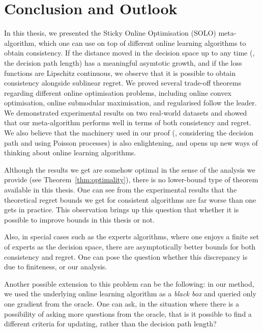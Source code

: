 \chapter{Conclusion and Outlook}

In this thesis, we presented the Sticky Online Optimisation (SOLO) meta-algorithm, which one can use on top of different online learning algorithms to obtain consistency. If the distance moved in the decision space up to any time (\ie, the decision path length) has a meaningful asymtotic growth, and if the loss functions are Lipschitz continuous, we observe that it is possible to obtain consistency alongside sublinear regret. We proved several trade-off theorems regarding different online optimisation problems, including online convex optimisation, online submodular maximisation, and regularised follow the leader. We demonstrated experimental results on two real-world datasets and showed that our meta-algorithm performs well in terms of both consistency and regret. We also believe that the machinery used in our proof (\eg, considering the decision path and using Poisson processes) is also enlightening, and opens up new ways of thinking about online learning algorithms.

Although the results we get are somehow optimal in the sense of the analysis we provide (see Theorem~\ref{thm:optimality}), there is no lower-bound type of theorem available in this thesis. One can see from the experimental results that the theoretical regret bounds we get for consistent algorithms are far worse than one gets in practice. This observation brings up this question that whether it is possible to improve bounds in this thesis or not.

Also, in special cases such as the experts algorithms, where one enjoys a finite set of experts as the decision space, there are asymptotically better bounds for both consistency and regret. One can pose the question whether this discrepancy is due to finiteness, or our analysis. 

Another possible extension to this problem can be the following: in our method, we used the underlying online learning algorithm as a \emph{black box} and queried only one gradient from the oracle. One can ask, in the situation where there is a possibility of asking more questions from the oracle, that is it possible to find a different criteria for updating, rather than the decision path length?

